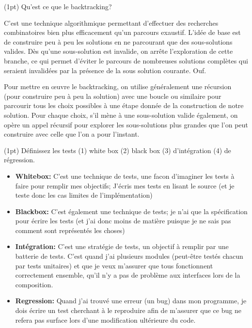 \documentclass[10pt]{article}\usepackage[nu]{esial}
\begin{document}
\Question(1pt) Qu'est ce que le backtracking?

\begin{Reponse}
  C'est une technique algorithmique permettant d'effectuer des recherches
  combinatoires bien plus efficacement qu'un parcours exaustif. L'idée de base
  est de construire peu à peu les solutions en ne parcourant que des
  sous-solutions valides. Dès qu'une sous-solution est invalide, on arrête
  l'exploration de cette branche, ce qui permet d'éviter le parcours de
  nombreuses solutions complètes qui seraient invalidées par la présence de la
  sous solution courante. Ouf.
  
  Pour mettre en œuvre le backtracking, on utilise généralement une récursion
  (pour construire peu à peu la solution) avec une boucle ou similaire pour
  parcourir tous les choix possibles à une étape donnée de la construction de
  notre solution. Pour chaque choix, s'il mène à une sous-solution valide
  également, on opère un appel récursif pour explorer les sous-solutions plus
  grandes que l'on peut construire avec celle que l'on a pour l'instant. 
\end{Reponse}

\ifcorrection{\newpage}{}

\Question(1pt) Définissez les tests (1) white box (2) black box (3)
d'intégration (4) de régression.

\begin{Reponse}
  \begin{itemize}
  \item \textbf{Whitebox:} C'est une technique de tests, une facon d'imaginer
    les tests à faire pour remplir mes objectifs; J'écris mes tests en lisant
    le source (et je teste donc les cas limites de l'implémentation)
  \item \textbf{Blackbox:} C'est également une technique de tests; je n'ai que
    la spécification pour écrire les tests (et j'ai donc moins de matière
    puisque je ne sais pas comment sont représentés les choses)
  \item \textbf{Intégration:} C'est une stratégie de tests, un objectif à
    remplir par une batterie de tests. C'est quand j'ai plusieurs modules
    (peut-être testés chacun par tests unitaires) et que je veux m'assurer que
    tous fonctionnent correctement ensemble, qu'il n'y a pas de problème aux
    interfaces lors de la composition.
  \item \textbf{Regression:} Quand j'ai trouvé une erreur (un bug) dans mon
    programme, je dois écrire un test cherchant à le reproduire afin de
    m'assurer que ce bug ne refera pas surface lors d'une modification
    ultérieure du code. 
  \end{itemize}
\end{Reponse}
\end{document}
